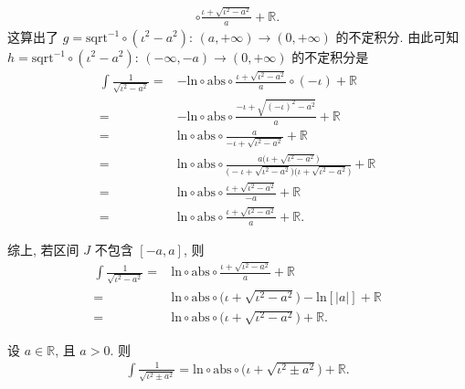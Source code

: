 \begin{example}
\begin{align*}
        \circ \frac{\iota + \sqrt{\iota^2 - a^2}}{a} + \mathbb{R}.
    \end{align*}
    这算出了
    $g = \mathrm{sqrt}^{-1} \circ (\iota^2 - a^2)$: $(a, +\infty) \to (0, +\infty)$
    的不定积分.
    由此可知
    $h = \mathrm{sqrt}^{-1} \circ (\iota^2 - a^2)$: $(-\infty, -a) \to (0, +\infty)$
    的不定积分是
    \begin{align*}
        \int {\frac{1}{\sqrt{\iota^2 - a^2}}}
        = {} & {-\mathrm{ln}} \circ \mathrm{abs}
        \circ \frac{\iota + \sqrt{\iota^2 - a^2}}{a} \circ (-\iota)
        + \mathbb{R}                                          \\
        = {} & {-\mathrm{ln}} \circ \mathrm{abs}
        \circ \frac{-\iota + \sqrt{(-\iota)^2 - a^2}}{a}
        + \mathbb{R}                                          \\
        = {} & \mathrm{ln} \circ \mathrm{abs}
        \circ \frac{a}{-\iota + \sqrt{\iota^2 - a^2}}
        + \mathbb{R}                                          \\
        = {} & \mathrm{ln} \circ \mathrm{abs}
        \circ \frac{a \big(\iota + \sqrt{\iota^2 - a^2} \big)}
        {\big(-\iota + \sqrt{\iota^2 - a^2} \big)
        \big(\iota + \sqrt{\iota^2 - a^2} \big)} + \mathbb{R} \\
        = {} & \mathrm{ln} \circ \mathrm{abs}
        \circ \frac{\iota + \sqrt{\iota^2 - a^2}}{-a}
        + \mathbb{R}                                          \\
        = {} & \mathrm{ln} \circ \mathrm{abs}
        \circ \frac{\iota + \sqrt{\iota^2 - a^2}}{a}
        + \mathbb{R}.
    \end{align*}

    综上, 若区间 $J$ 不包含 $[-a, a]$, 则
    \begin{align*}
        \int {\frac{1}{\sqrt{\iota^2 - a^2}}}
        = {} & \mathrm{ln} \circ \mathrm{abs}
        \circ \frac{\iota + \sqrt{\iota^2 - a^2}}{a}
        + \mathbb{R}                          \\
        = {} & \mathrm{ln} \circ \mathrm{abs}
        \circ \big( \iota + \sqrt{\iota^2 - a^2} \big)
        - \mathrm{ln}[|a|] + \mathbb{R}       \\
        = {} & \mathrm{ln} \circ \mathrm{abs}
        \circ \big( \iota + \sqrt{\iota^2 - a^2} \big)
        + \mathbb{R}.
    \end{align*}
\end{example}

\begin{remark}
    设 $a \in \mathbb{R}$, 且 $a > 0$.
    则
    \begin{align*}
        \int {\frac{1}{\sqrt{\iota^2 \pm a^2}}} = \mathrm{ln} \circ \mathrm{abs} \circ \big( \iota + \sqrt{\iota^2 \pm a^2} \big) + \mathbb{R}.
    \end{align*}
\end{remark}

